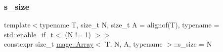 \subsubsection{\texorpdfstring{s\+\_\+size}{s\_size}}
{\footnotesize\ttfamily template$<$typename T, size\+\_\+t N, size\+\_\+t A = alignof(\+T), typename  = std\+::enable\+\_\+if\+\_\+t$<$ (\+N != 1) $>$$>$ \\
constexpr size\+\_\+t \mbox{\hyperlink{structmage_1_1_array}{mage\+::\+Array}}$<$ T, N, A, typename $>$\+::s\+\_\+size = N\hspace{0.3cm}{\ttfamily [static]}}

